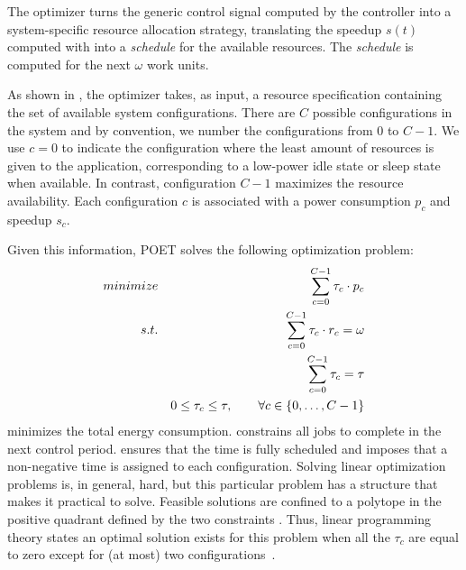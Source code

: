 The optimizer turns the generic control signal computed by the controller into a system-specific resource allocation strategy, translating the speedup $s(t)$ computed with  into a \emph{schedule} for the available resources.
The \emph{schedule} is computed for the next $\omega$ work units.

As shown in , the optimizer takes, as input, a resource specification containing the set of available system configurations.
There are $C$ possible configurations in the system and by convention, we number the configurations from $0$ to $C-1$.
We use $c = 0$ to indicate the configuration where the least amount of resources is given to the application, corresponding to a low-power idle state or sleep state when available.
In contrast, configuration $C-1$ maximizes the resource availability.
Each configuration $c$ is associated with a power consumption $p_c$ and speedup $s_c$.

Given this information, POET solves the following optimization problem:
\begin{eqnarray}
\minimize && \sum_{c=0}^{C-1} \tau_c \cdot p_c \label{eqn:poet-power} \\
\st %
&& \sum_{c=0}^{C-1} \tau_c \cdot r_c =  \omega \label{eqn:poet-work} \\
&& \sum_{c=0}^{C-1} \tau_c =  \tau \label{eqn:poet-deadline} \\
&& 0 \le \tau_c \le \tau, \qquad \forall c \in \{0,\ldots,C-1\} \label{eqn:poet-time}
\end{eqnarray}
 minimizes the total energy consumption.
 constrains all jobs to complete in the next control period.
 ensures that the time is fully scheduled and  imposes that a non-negative time is assigned to each configuration.
Solving linear optimization problems is, in general, hard, but this particular problem has a structure that makes it practical to solve.
Feasible solutions are confined to a polytope in the positive quadrant defined by the two constraints .
Thus, linear programming theory states an optimal solution exists for this problem when all the $\tau_c$ are equal to zero except for (at most) two configurations~\cite{LP}.

